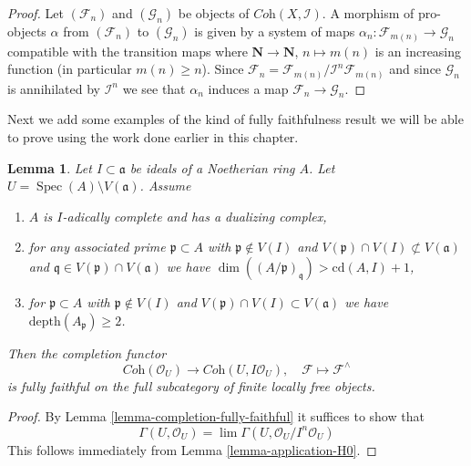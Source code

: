 \documentclass{stacks-project}
\theoremstyle{plain}
\newtheorem{lemma}[subsection]{Lemma}
\theoremstyle{definition}
\theoremstyle{remark}
\numberwithin{equation}{subsection}
\def\lim{\mathop{\mathrm{lim}}\nolimits}
\def\Spec{\mathop{\mathrm{Spec}}}
\begin{document}
\begin{proof}
Let $(\mathcal{F}_n)$ and $(\mathcal{G}_n)$ be objects of
$\textit{Coh}(X, \mathcal{I})$. A morphism of pro-objects
$\alpha$ from $(\mathcal{F}_n)$ to $(\mathcal{G}_n)$ is given
by a system of maps
$\alpha_n : \mathcal{F}_{m(n)} \to \mathcal{G}_n$ compatible with
the transition maps where $\mathbf{N} \to \mathbf{N}$, $n \mapsto m(n)$
is an increasing function (in particular $m(n) \geq n$). Since
$\mathcal{F}_n = \mathcal{F}_{m(n)}/\mathcal{I}^n\mathcal{F}_{m(n)}$
and since $\mathcal{G}_n$ is annihilated by $\mathcal{I}^n$
we see that $\alpha_n$ induces a map $\mathcal{F}_n \to \mathcal{G}_n$.
\end{proof}

\noindent
Next we add some examples of the kind of fully faithfulness
result we will be able to prove using the work done earlier in this chapter.

\begin{lemma}
\label{lemma-fully-faithful}
Let $I \subset \mathfrak a$ be ideals of a Noetherian ring $A$.
Let $U = \Spec(A) \setminus V(\mathfrak a)$. Assume
\begin{enumerate}
\item $A$ is $I$-adically complete and has a dualizing complex,
\item for any associated prime $\mathfrak p \subset A$ with
$\mathfrak p \not \in V(I)$ and
$V(\mathfrak p) \cap V(I) \not \subset V(\mathfrak a)$ and
$\mathfrak q \in V(\mathfrak p) \cap V(\mathfrak a)$ we have
$\dim((A/\mathfrak p)_\mathfrak q) > \text{cd}(A, I) + 1$,
\item for $\mathfrak p \subset A$ with $\mathfrak p \not \in V(I)$
and $V(\mathfrak p) \cap V(I) \subset V(\mathfrak a)$
we have $\text{depth}(A_\mathfrak p) \geq 2$.
\end{enumerate}
Then the completion functor
$$
\textit{Coh}(\mathcal{O}_U)
\longrightarrow
\textit{Coh}(U, I\mathcal{O}_U),
\quad
\mathcal{F} \longmapsto \mathcal{F}^\wedge
$$
is fully faithful on the full subcategory of
finite locally free objects.
\end{lemma}

\begin{proof}
By Lemma \ref{lemma-completion-fully-faithful}
it suffices to show that
$$
\Gamma(U, \mathcal{O}_U) =
\lim \Gamma(U, \mathcal{O}_U/I^n\mathcal{O}_U)
$$
This follows immediately from
Lemma \ref{lemma-application-H0}.
\end{proof}
\end{document}

